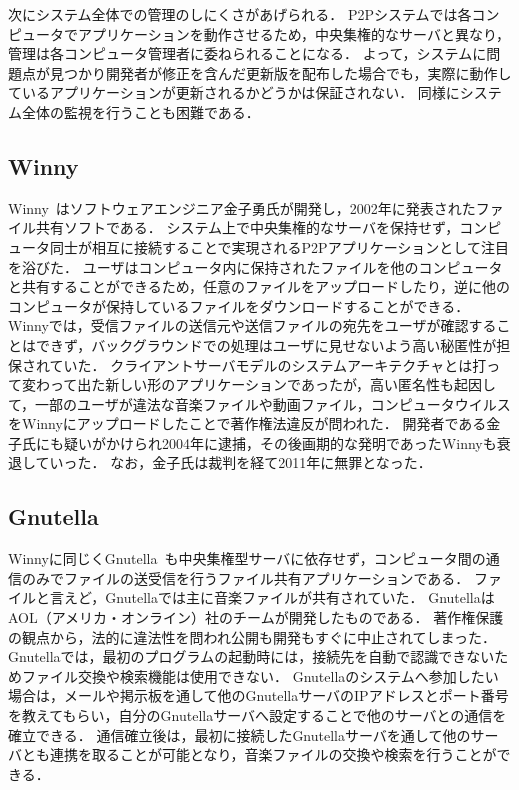 次にシステム全体での管理のしにくさがあげられる．
P2Pシステムでは各コンピュータでアプリケーションを動作させるため，中央集権的なサーバと異なり，管理は各コンピュータ管理者に委ねられることになる．
よって，システムに問題点が見つかり開発者が修正を含んだ更新版を配布した場合でも，実際に動作しているアプリケーションが更新されるかどうかは保証されない．
同様にシステム全体の監視を行うことも困難である．

\subsection{Winny}

Winny~\cite{Winny}はソフトウェアエンジニア金子勇氏が開発し，2002年に発表されたファイル共有ソフトである．
システム上で中央集権的なサーバを保持せず，コンピュータ同士が相互に接続することで実現されるP2Pアプリケーションとして注目を浴びた．
ユーザはコンピュータ内に保持されたファイルを他のコンピュータと共有することができるため，任意のファイルをアップロードしたり，逆に他のコンピュータが保持しているファイルをダウンロードすることができる．
Winnyでは，受信ファイルの送信元や送信ファイルの宛先をユーザが確認することはできず，バックグラウンドでの処理はユーザに見せないよう高い秘匿性が担保されていた．
クライアントサーバモデルのシステムアーキテクチャとは打って変わって出た新しい形のアプリケーションであったが，高い匿名性も起因して，一部のユーザが違法な音楽ファイルや動画ファイル，コンピュータウイルスをWinnyにアップロードしたことで著作権法違反が問われた．
開発者である金子氏にも疑いがかけられ2004年に逮捕，その後画期的な発明であったWinnyも衰退していった．
なお，金子氏は裁判を経て2011年に無罪となった．

\subsection{Gnutella}

Winnyに同じくGnutella~\cite{Gnutella}も中央集権型サーバに依存せず，コンピュータ間の通信のみでファイルの送受信を行うファイル共有アプリケーションである．
ファイルと言えど，Gnutellaでは主に音楽ファイルが共有されていた．
GnutellaはAOL（アメリカ・オンライン）社のチームが開発したものである．
著作権保護の観点から，法的に違法性を問われ公開も開発もすぐに中止されてしまった．
Gnutellaでは，最初のプログラムの起動時には，接続先を自動で認識できないためファイル交換や検索機能は使用できない．
Gnutellaのシステムへ参加したい場合は，メールや掲示板を通して他のGnutellaサーバのIPアドレスとポート番号を教えてもらい，自分のGnutellaサーバへ設定することで他のサーバとの通信を確立できる．
通信確立後は，最初に接続したGnutellaサーバを通して他のサーバとも連携を取ることが可能となり，音楽ファイルの交換や検索を行うことができる．

